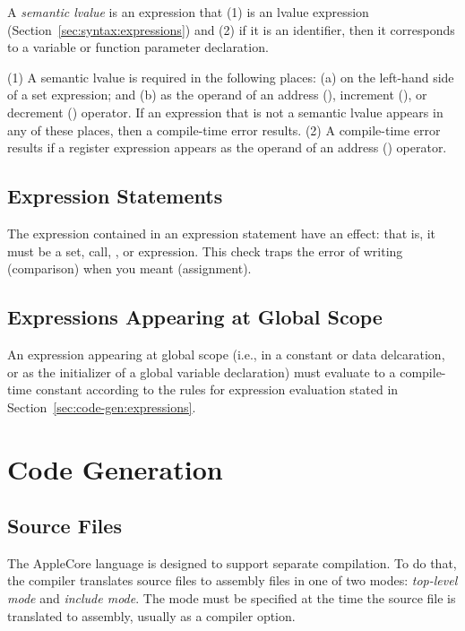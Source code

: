 \documentclass[10pt]{article}
\begin{document}
  A \emph{semantic lvalue} is
an expression that (1) is an lvalue expression
(Section~\ref{sec:syntax:expressions}) and (2) if it is an identifier,
then it corresponds to a variable or function parameter declaration.

  (1) A semantic lvalue is
required in the following places: (a) on the left-hand side of a set
expression; and (b) as the operand of an address (), increment
(), or decrement () operator.  If an expression
that is not a semantic lvalue appears in any of these places, then a
compile-time error results.  (2) A compile-time error results if a
register expression appears as the operand of an address ()
operator.


\subsection{Expression Statements}
\label{sec:semantics:expr-stmts}

The expression contained in an expression statement have an effect:
that is, it must be a set, call, , or  expression.
This check traps the error of writing  (comparison) when
you meant  (assignment).

\subsection{Expressions Appearing at Global Scope}

An expression appearing at global scope (i.e., in a constant or data
delcaration, or as the initializer of a global variable declaration)
must evaluate to a compile-time constant according to the rules for
expression evaluation stated in
Section~\ref{sec:code-gen:expressions}.

\section{Code Generation}
\label{sec:code-gen}

\subsection{Source Files}
\label{sec:code-gen:source-files}

The AppleCore language is designed to support separate compilation.
To do that, the compiler translates source files to assembly files in
one of two modes: \emph{top-level mode} and \emph{include mode}.  The
mode must be specified at the time the source file is translated to
assembly, usually as a compiler option.
\end{document}
